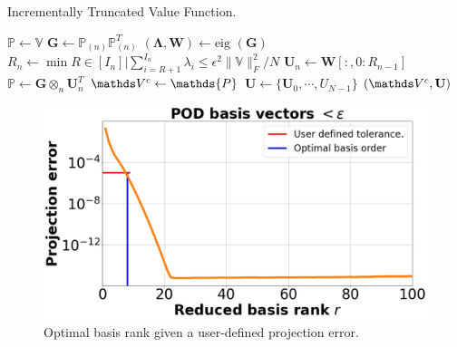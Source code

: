 \begin{savenotes}
	\begin{algorithm}[tb!]
		\caption{Incrementally Truncated Value Function\cite{TuckerMPI}.}
		\label{alg:st-hosvd}
		\begin{algorithmic}[1]
			\State $\mathds{P} \leftarrow \mathds{V}$ 
			\State$\mathbf{G} \leftarrow \mathds{P}_{(n)} \mathds{P}_{(n)}^T$
			\State$(\bm{\Lambda}, \mathbf{W}) \leftarrow \text{eig } (\mathbf{G})$
			\State $R_{n} \leftarrow \min { R \in \left[ I_{n} \right] | \sum_{i=R+1}^{I_n} \lambda_i \le \epsilon^2 \|\mathds{V}\|^2_F / N }$
			\State $\mathbf{U}_n \leftarrow \mathbf{W}\left[:,0:R_{n-1}\right]$
			\State $\mathds{P} \leftarrow \mathbf{G} \otimes_n \mathbf{U}_n^T$
			\EndFor
			\State $\valuecore \leftarrow \mathds{P}$ 
			\State $\mathbf{U} \leftarrow \{\mathbf{U}_0, \cdots, U_{N-1} \}$
			\State \Return $(\valuecore, \mathbf{U})$
			\EndFunction
		\end{algorithmic}
	\end{algorithm}
\end{savenotes}


\begin{figure}[tb!]
	\centering
	\includegraphics[width=\columnwidth]{figures/proj_error.jpg}
	\caption{Optimal basis rank given a user-defined projection error.}
	\label{fig:proj_error}
\end{figure}


